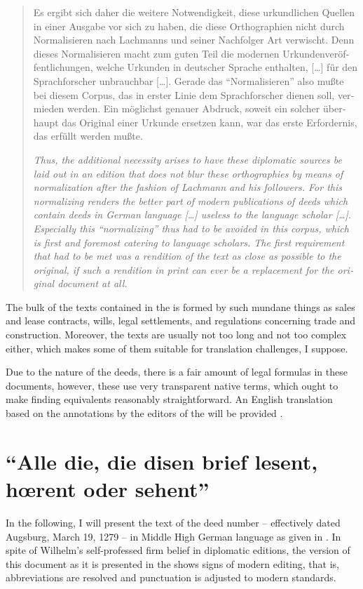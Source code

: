 \documentclass[12pt,paper=a4]{scrartcl}
\begin{document}
\foreignblockquote{german}{\begin{multicols}{2}Es ergibt sich daher die weitere 
Notwendigkeit, diese urkundlichen Quellen in einer Ausgabe vor sich zu haben, 
die diese Orthographien nicht durch Normalisieren nach Lachmanns und seiner 
Nachfolger Art verwischt. Denn dieses Normalisieren macht zum guten Teil die 
modernen Urkundenveröffentlichungen, welche Urkunden in deutscher Sprache 
ent\-halten, […] für den Sprachforscher un\-brauch\-bar […]. Gerade das 
\enquote{Normalisieren} also mußte bei diesem Corpus, das in erster Linie dem 
Sprachforscher dienen soll, vermieden werden. Ein möglichst genauer Abdruck, 
soweit ein solcher überhaupt das Original einer Urkunde ersetzen kann, war das 
erste Erfordernis, das erfüllt werden mußte. \autocite[LX]{CAO1}

\columnbreak

{\itshape Thus, the additional necessity arises to have these diplomatic sources 
be laid out in an edition that does not blur these orthographies by means of 
normalization after the fashion of Lachmann and his followers. For this 
normalizing renders the better part of modern publications of deeds which 
contain deeds in German language […] useless to the language scholar […]. 
Especially this \enquote{normalizing} thus had to be avoided in this corpus, 
which is first and foremost catering to language scholars. The first requirement 
that had to be met was a rendition of the text as close as possible to the 
original, if such a rendition in print can ever be a replacement for the 
original document at all.}\end{multicols}}

The bulk of the texts contained in the  is formed by such mundane 
things as sales and lease contracts, wills, legal settlements, and regulations 
concerning trade and construction. Moreover, the texts are usually not too long 
and not too complex either, which makes some of them suitable for translation 
challenges, I suppose.

Due to the nature of the deeds, there is a fair amount of legal formulas in 
these documents, however, these use very transparent native terms, which ought 
to make finding equivalents reasonably straightforward. An English translation 
based on the annotations by the editors of the  will be provided 
\autocite[see][]{n163-online}.

\section{\enquote{Alle die, die disen brief lesent, hœrent oder sehent}}
In the following, I will present the text of the deed number 
 -- effectively dated Augsburg, March 19, 1279 -- in 
Middle High German language as given in \textcites{n163}{n163-online}. In spite 
of Wilhelm's self-professed firm belief in diplomatic editions, the version of 
this document as it is presented in the  shows signs of modern 
editing, that is, abbreviations are resolved and punctuation is adjusted to 
modern standards.
\end{document}
